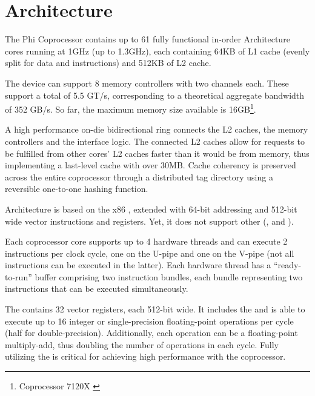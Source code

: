 \documentclass[../thesis]{subfiles}
\begin{document}
	\section{Architecture}
	\label{sec:mic:arch}

	The \intel\xeon Phi Coprocessor contains up to 61 fully functional in-order \intel\mic Architecture cores running at 1GHz (up to 1.3GHz), each containing 64KB of L1 cache (evenly split for data and instructions) and 512KB of L2 cache.

	The device can support 8 memory controllers with two  channels each. These support a total of 5.5 GT/s, corresponding to a theoretical aggregate bandwidth of 352 GB/s. So far, the maximum memory size available is 16GB\footnote{\intel\xeonphi Coprocessor 7120X \cite{intel:datasheet:xeonphi}}.

	A high performance on-die bidirectional ring connects the L2 caches, the memory controllers and the \pcie interface logic. The connected L2 caches allow for requests to be fulfilled from other cores' L2 caches faster than it would be from memory, thus implementing a last-level cache with over 30MB. Cache coherency is preserved across the entire coprocessor through a distributed tag directory using a reversible one-to-one hashing function.

	\intel\mic Architecture is based on the x86 \isa, extended with 64-bit addressing and 512-bit wide \simd vector instructions and registers. Yet, it does not support other \simd\isas (\mmx, \intel\sse and \intel\avx).

	Each coprocessor core supports up to 4 hardware threads and can execute 2 instructions per clock cycle, one on the U-pipe and one on the V-pipe (not all instructions can be executed in the latter). Each hardware thread has a ``ready-to-run'' buffer comprising two instruction bundles, each bundle representing two instructions that can be executed simultaneously.

	The \vpu contains 32 vector registers, each 512-bit wide. It includes the \emu and is able to execute up to 16 integer or single-precision floating-point operations per cycle (half for double-precision). Additionally, each operation can be a floating-point multiply-add, thus doubling the number of operations in each cycle. Fully utilizing the \vpu is critical for achieving high performance with the coprocessor.
\end{document}
